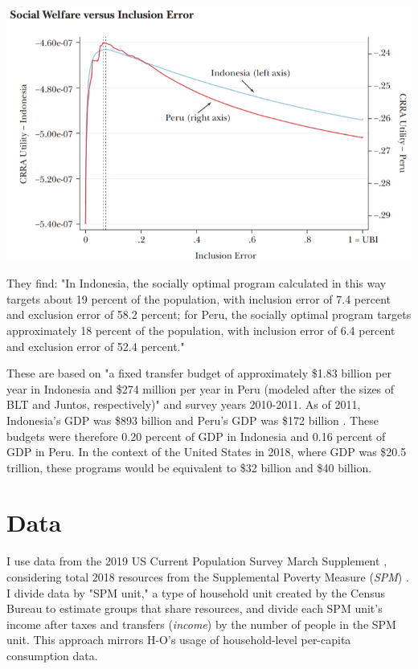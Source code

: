 \documentclass[12pt]{article}
\begin{document}
\begin{center}
	\includegraphics[width=15cm]{../img/hanna_olken_2018_social_welfare_vs_inclusion_error}
	\label{fig:ho_sw_inclusion_error}
\end{center}

They find: "In Indonesia, the socially optimal program calculated in this way 
targets about 19 percent of the population, with inclusion error of 7.4 percent 
and exclusion error of 58.2 percent; for Peru, the socially optimal program 
targets approximately 18 percent of the population, with inclusion error of 6.4 
percent and exclusion error of 52.4 percent."

These are based on "a fixed transfer budget of approximately \$1.83 billion per 
year in Indonesia and \$274 million per year in Peru (modeled after the sizes 
of BLT and Juntos, respectively)" and survey years 2010-2011. As of 2011, 
Indonesia's GDP was \$893 billion and Peru's GDP was \$172 billion \cite{wb}.
These budgets were therefore 0.20 percent of GDP in Indonesia and 0.16 percent 
of GDP in Peru.
In the context of the United States in 2018, where GDP was \$20.5 
trillion,
these programs would be equivalent to \$32 billion and \$40 billion.


\section{Data} \label{sec:data}

I use data from the 2019 US Current Population Survey March
Supplement \cite{asec}, 
considering total 2018 resources from the Supplemental Poverty Measure
(\textit{SPM}) \cite{spm}.
I divide data by "SPM unit," a type of household unit created by the Census 
Bureau to estimate groups that share resources,
and divide each SPM unit's income after taxes and transfers (\textit{income})
by the number of people in the SPM unit.
This approach mirrors H-O's usage of household-level per-capita consumption 
data.
\end{document}
